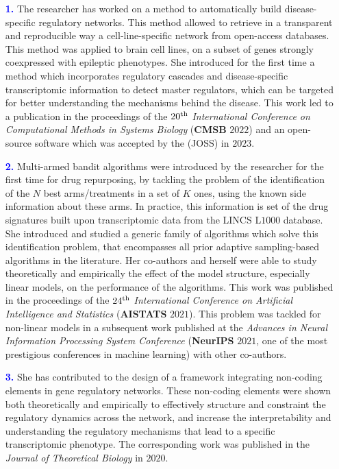 \documentclass[11pt,a4paper,sans]{moderncv}
\begin{document}
\begin{enumerate}
    \item[\textbf{\textcolor{blue}{1.}}] The researcher has worked on a method to automatically build disease-specific regulatory networks. This method allowed to retrieve in a transparent and reproducible way a cell-line-specific network from open-access databases. This method was applied to brain cell lines, on a subset of genes strongly coexpressed with epileptic phenotypes. She introduced for the first time a method which incorporates regulatory cascades and disease-specific transcriptomic information to detect master regulators, which can be targeted for better understanding the mechanisms behind the disease. This work led to a publication in the proceedings of the $20^\textnormal{th}$ \textit{International Conference on Computational Methods in Systems Biology} (\textbf{CMSB} $2022$) and an open-source software which was accepted by the  (JOSS) in $2023$.
    \item[\textbf{\textcolor{blue}{2.}}] Multi-armed bandit algorithms were introduced by the researcher for the first time for drug repurposing, by tackling the problem of the identification of the $N$ best arms/treatments in a set of $K$ ones, using the known side information about these arms. In practice, this information is set of the drug signatures built upon transcriptomic data from the LINCS L$1000$ database. She introduced and studied a generic family of algorithms which solve this identification problem, that encompasses all prior adaptive sampling-based algorithms in the literature. Her co-authors and herself were able to study theoretically and empirically the effect of the model structure, especially linear models, on the performance of the algorithms. This work was published in the proceedings of the $24^\textnormal{th}$ \textit{International Conference on Artificial Intelligence and Statistics} (\textbf{AISTATS} $2021$). This problem was tackled for non-linear models in a subsequent work published at the \textit{Advances in Neural Information Processing System Conference} (\textbf{NeurIPS} $2021$, one of the most prestigious conferences in machine learning) with other co-authors.
    \item[\textbf{\textcolor{blue}{3.}}] She has contributed to the design of a framework integrating non-coding elements in gene regulatory networks. These non-coding elements were shown both theoretically and empirically to effectively structure and constraint the regulatory dynamics across the network, and increase the interpretability and understanding the regulatory mechanisms that lead to a specific transcriptomic phenotype. The corresponding work was published in the \textit{Journal of Theoretical Biology} in $2020$.
\end{enumerate}
\vspace{-0.1cm}
\end{document}
